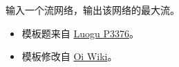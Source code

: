 \noindent 输入一个流网络，输出该网络的最大流。

\begin{itemize}
    \item 模板题来自 \href{https://www.luogu.com.cn/problem/P3376}{Luogu P3376}。
    \item 模板修改自 \href{https://oi-wiki.org/graph/flow/max-flow/}{Oi Wiki}。
\end{itemize}